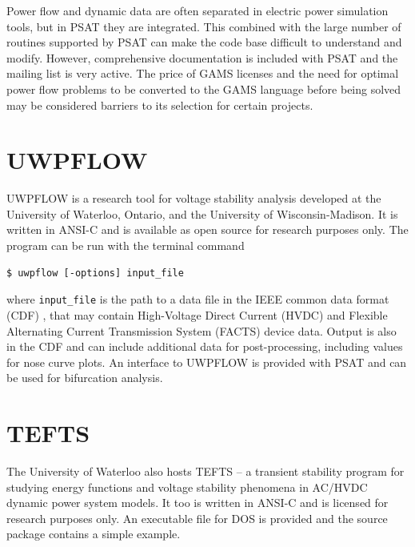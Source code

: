 Power flow and dynamic data are often separated in electric power
simulation tools, but in PSAT they are integrated.  This combined with the
large number of routines supported by PSAT can make the code base difficult to
understand and modify.  However, comprehensive documentation is included with
PSAT and the mailing list is very active.
The price of GAMS
licenses and the need for optimal power flow problems to be converted to the
GAMS language before being solved may be considered barriers to its
selection for certain projects.

\section{UWPFLOW}
UWPFLOW is a research tool for voltage stability analysis developed at the
University of Waterloo, Ontario, and the University of Wisconsin-Madison.  It
is written in ANSI-C and is available as open source for research purposes
only. The program can be run with the terminal command
\begin{center}
\begin{verbatim}
$ uwpflow [-options] input_file
\end{verbatim}
\end{center}
where \texttt{input\_file} is the path to a data file in the IEEE common data
format (CDF) \cite{cdf:73}, that may contain High-Voltage Direct Current (HVDC)
and Flexible Alternating Current Transmission System (FACTS) device data.
Output is also in the CDF and can include additional data for post-processing,
including values for nose curve plots.  An interface to UWPFLOW is provided
with PSAT and can be used for bifurcation analysis.

\section{TEFTS}
The University of Waterloo also hosts TEFTS -- a transient stability program
for studying energy functions and voltage stability phenomena in AC/HVDC
dynamic power system models.  It too is written in ANSI-C and is licensed for
research purposes only.  An executable file for DOS is provided and the source
package contains a simple example.

